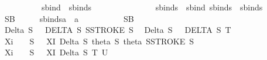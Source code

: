 \begin{isabellebody}
\ \ {\isachardoublequoteopen}{\isachardoublequoteclose}\ \ \ \ \ \ \ \ {\isacharcolon}{\isacharcolon}\ {\isachardoublequoteopen}sbind\ {\isacharequal}{\isachargreater}\ sbinds{\isachardoublequoteclose}\ \ \ \ \ \ \ \ \ \ \ \ \ {\isacharparenleft}{\isachardoublequoteopen}{\isacharunderscore}{\isachardoublequoteclose}{\isacharparenright}\isanewline
\ \ {\isachardoublequoteopen}{\isacharunderscore}sbinds{\isachardoublequoteclose}\ {\isacharcolon}{\isacharcolon}\ {\isachardoublequoteopen}{\isacharbrackleft}sbind{\isacharcomma}\ sbinds{\isacharbrackright}\ {\isacharequal}{\isachargreater}\ sbinds{\isachardoublequoteclose}\ \ \ {\isacharparenleft}{\isachardoublequoteopen}{\isacharunderscore}{\isacharcomma}{\isacharslash}\ {\isacharunderscore}{\isachardoublequoteclose}{\isacharparenright}\ \ \isanewline
\ \ {\isachardoublequoteopen}{\isacharunderscore}SB{\isachardoublequoteclose}\ \ \ \ \ {\isacharcolon}{\isacharcolon}\ {\isachardoublequoteopen}{\isacharbrackleft}sbinds{\isacharcomma}{\isacharprime}a{\isacharbrackright}\ {\isacharequal}{\isachargreater}\ {\isacharprime}a{\isachardoublequoteclose}\ \ \ \ \ \ \ \ \ \ \ {\isacharparenleft}{\isachardoublequoteopen}{\isacharparenleft}{}SB\ {\isacharparenleft}{\isacharunderscore}{\isacharparenright}{\isachardot}\ {\isacharparenleft}{\isacharunderscore}{\isacharparenright}{\isacharparenright}{\isachardoublequoteclose}\ {}{}{\isacharparenright}\isanewline
\isanewline
\isanewline
{}\isamarkupfalse%
\isanewline
\ \isanewline
\ \ {\isachardoublequoteopen}{\isacharpercent}Delta\ S{\isachardoublequoteclose}\ \ {\isacharequal}{\isachargreater}\ {\isachardoublequoteopen}DELTA\ S\ {\isacharparenleft}SSTROKE\ S{\isacharparenright}{\isachardoublequoteclose}\isanewline
\ \ {\isachardoublequoteopen}{\isacharpercent}Delta\ S{\isachardoublequoteclose}\ \ {\isacharless}{\isacharequal}\ {\isachardoublequoteopen}DELTA\ S\ T{\isachardoublequoteclose}\isanewline
\ \ {\isachardoublequoteopen}{\isacharpercent}Xi\ \ \ \ S{\isachardoublequoteclose}\ \ {\isacharequal}{\isachargreater}\ {\isachardoublequoteopen}XI\ {\isacharparenleft}{\isacharpercent}Delta\ S{\isacharparenright}\ {\isacharparenleft}{\isacharpercent}theta\ S{\isacharparenright}\ {\isacharparenleft}{\isacharpercent}theta\ {\isacharparenleft}SSTROKE\ S{\isacharparenright}{\isacharparenright}{\isachardoublequoteclose}\isanewline
\ \ {\isachardoublequoteopen}{\isacharpercent}Xi\ \ \ \ S{\isachardoublequoteclose}\ \ {\isacharless}{\isacharequal}\ {\isachardoublequoteopen}XI\ {\isacharparenleft}{\isacharpercent}Delta\ S{\isacharparenright}\ {\isacharparenleft}T{\isacharparenright}\ {\isacharparenleft}U{\isacharparenright}{\isachardoublequoteclose}\isanewline

\end{isabellebody}
